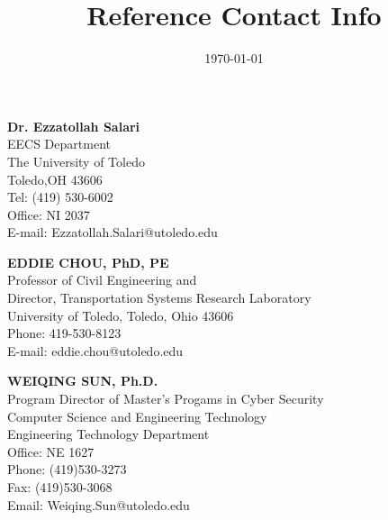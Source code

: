 \documentclass[11pt]{article}
\date{\today}
\title{Reference Contact Info}
\begin{document}
\maketitle
\item \textbf{Dr. Ezzatollah Salari} \\
EECS Department\\
The University of Toledo\\
Toledo,OH 43606 \\
Tel: (419) 530-6002 \\
Office: NI 2037 \\
E-mail:  Ezzatollah.Salari@utoledo.edu \\

\item \textbf{EDDIE CHOU, PhD, PE} \\
Professor of Civil Engineering and\\
Director, Transportation Systems Research Laboratory\\
University of Toledo, Toledo, Ohio 43606\\
Phone: 419-530-8123\\
E-mail: eddie.chou@utoledo.edu\\

\item \textbf{WEIQING SUN, Ph.D.} \\
Program Director of Master's Progams in Cyber Security\\
Computer Science and Engineering Technology\\
Engineering Technology Department\\
Office: NE 1627\\
Phone: (419)530-3273\\
Fax: (419)530-3068\\
Email: Weiqing.Sun@utoledo.edu
\end{document}
